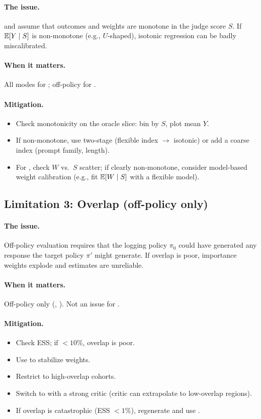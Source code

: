 \paragraph{The issue.} \autocal{} and \simcal{} assume that outcomes and weights are monotone in the judge score $S$. If $\operatorname{\mathbb{E}}[Y \mid S]$ is non-monotone (e.g., $U$-shaped), isotonic regression can be badly miscalibrated.

\paragraph{When it matters.} All modes for \autocal; off-policy for \simcal.

\paragraph{Mitigation.}
\begin{itemize}
\item Check monotonicity on the oracle slice: bin by $S$, plot mean $Y$.
\item If non-monotone, use two-stage \autocal{} (flexible index $\to$ isotonic) or add a coarse index (prompt family, length).
\item For \simcal, check $W$ vs.\ $S$ scatter; if clearly non-monotone, consider model-based weight calibration (e.g., fit $\operatorname{\mathbb{E}}[W \mid S]$ with a flexible model).
\end{itemize}

\subsection{Limitation 3: Overlap (off-policy only)}

\paragraph{The issue.} Off-policy evaluation requires that the logging policy $\pi_0$ could have generated any response the target policy $\pi'$ might generate. If overlap is poor, importance weights explode and estimates are unreliable.

\paragraph{When it matters.} Off-policy only (\ips, \dr). Not an issue for \dm.

\paragraph{Mitigation.}
\begin{itemize}
\item Check ESS; if $< 10\%$, overlap is poor.
\item Use \simcal{} to stabilize weights.
\item Restrict to high-overlap cohorts.
\item Switch to \dr{} with a strong critic (critic can extrapolate to low-overlap regions).
\item If overlap is catastrophic (ESS $< 1\%$), regenerate and use \dm.
\end{itemize}


